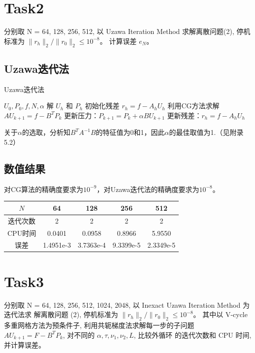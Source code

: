 \documentclass{article}
\begin{document}
\section{Task2}

分别取 N = 64, 128, 256, 512, 以 Uzawa Iteration Method 求解离散问题(2), 停机标准为 $\|r_h\|_{2} / \|r_{0}\|_{2} \leq 10^{-8}$。
计算误差 $e_{N}$。

\subsection{Uzawa迭代法}
\begin{algorithm}
  \caption{Uzawa迭代法}
  \begin{algorithmic}[1]
    \Require $U_0, P_0, f, N, \alpha$
    \Ensure 解 $U_h$ 和 $P_h$
    \State 初始化残差 $r_h = f - A_h U_h$
      \State 利用CG方法求解$A U_{k+1} = f - B^T P_k$
      \State 更新压力：$P_{k+1} = P_k + \alpha B U_{k+1}$
      \State 更新残差：$r_h = f - A_h U_h$
    \EndWhile
  \end{algorithmic}
\end{algorithm}

关于$\alpha$的选取，分析知$ B^T A^{-1} B$的特征值为0和1，因此$\alpha$的最佳取值为1.（见附录5.2）

\subsection{数值结果}
对CG算法的精确度要求为$10^{-9}$，对Uzawa迭代法的精确度要求为$10^{-8}$。
\begin{table}[!h]
  \centering
  \begin{tabular}{ccccc}
    \toprule
    $N$ & 64 & 128 & 256 & 512 \\
    \midrule
    迭代次数 & 2 & 2 & 2 & 2 \\
    CPU时间 & 0.0401 & 0.0958 & 0.8966 & 5.9550 \\
    误差 & 1.4951e-3 & 3.7363e-4 & 9.3399e-5 & 2.3349e-5 \\
    \bottomrule
  \end{tabular}
\end{table}

\section{Task3}

分别取 N = 64, 128, 256, 512, 1024, 2048, 以 Inexact Uzawa Iteration Method 为迭代法求
解离散问题 (2), 停机标准为 $\|r_h\|_{2} / \|r_{0}\|_{2} \leq 10^{-8}$。
其中以 V-cycle 多重网格方法为预条件子,
利用共轭梯度法求解每一步的子问题 $AU_{k+1} = F - B^{T}P_{k}$, 对不同的 $\alpha, \tau, \nu_1, \nu_2, L$, 比较外循环
的迭代次数和 CPU 时间, 并计算误差。
\end{document}
